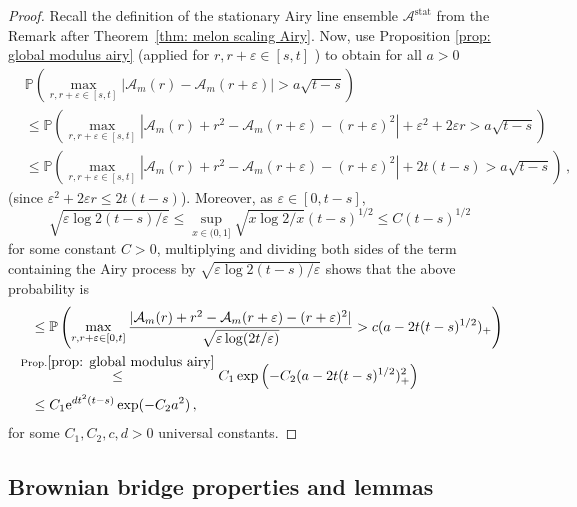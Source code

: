 \documentclass[11pt, reqno]{amsart}
\numberwithin{equation}{section}
\newcommand{\PP}{\ensuremath{\mathbb{P}}}
\begin{document}
\begin{proof}
       Recall the definition of the stationary Airy line ensemble $\mathcal{A}^{\mathrm{stat}}$ from the Remark after Theorem~\ref{thm: melon scaling Airy}. Now, use Proposition \ref{prop: global modulus airy} (applied for $r, r+\varepsilon\in [s,t]$ ) to obtain for all $a> 0$ 
    \begin{align*}
    &\displaystyle\PP\left(\max_{r,r+\varepsilon\in [s,t]}|\mathcal{A}_{m}(r) - \mathcal{A}_{m}(r + \varepsilon)|> a\sqrt{t-s}\right)\\
    &\le \displaystyle\PP\left(\max_{r,r+\varepsilon\in [s,t]}|\mathcal{A}_{m}(r) + r^2 - \mathcal{A}_{m}(r + \varepsilon)-(r+\varepsilon)^2| + \varepsilon^2 + 2\varepsilon r > a\sqrt{t-s}\right)\\
    &\le \displaystyle\PP\left(\max_{r,r+\varepsilon\in [s,t]}|\mathcal{A}_{m}(r) + r^2 - \mathcal{A}_{m}(r + \varepsilon)-(r+\varepsilon)^2| + 2 t (t-s) > a\sqrt{t-s}\right)\,,
    \end{align*}
    (since $\varepsilon^2 + 2\varepsilon r \le 2t(t-s)$). Moreover, as $\varepsilon \in [0,t-s]$,
    \begin{equation*}
    \sqrt{\varepsilon\log 2(t-s)/\varepsilon}\le \displaystyle\sup_{x\in (0,1]}\sqrt{x\log2/x} (t-s)^{1/2} \le C(t-s)^{1/2}
    \end{equation*}
    for some constant $C>0$,
    multiplying and dividing both sides of the term containing the Airy process by $\sqrt{\varepsilon\log 2(t-s)/\varepsilon}$ shows that the above probability is
    \begin{align*} 
    & \quad \le  \displaystyle\PP\left(\max_{r,r+\varepsilon\in [0,t]}\frac{|\mathcal{A}_{m}(r) + r^2 - \mathcal{A}_{m}(r + \varepsilon)-(r+\varepsilon)^2|}{\sqrt{\varepsilon\log(2t/\varepsilon)}} > c(a - 2t(t-s)^{1/2})_+\right)\\
    & \stackrel{\text{Prop.}\ref{prop: global modulus airy}}{\le} C_1 \exp \left( - C_2 (a - 2t(t-s)^{1/2})^2_+\right)\\
    & \quad \le C_1 \mathrm{e}^{dt^2(t-s)}\exp(-C_2 a^2)\,,
    \end{align*}
     for some $C_1, C_2, c, d>0$ universal constants. 
\end{proof}

\subsection{Brownian bridge properties and lemmas}\label{subsection: some basic lemmas}
\end{document}

